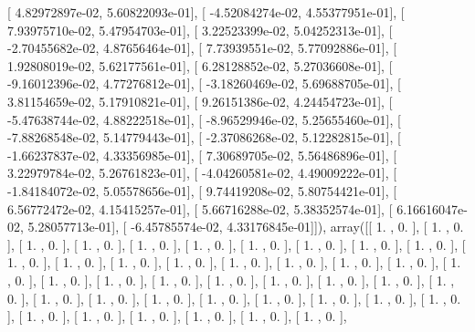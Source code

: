 \documentclass{article}
\begin{document}
       [  4.82972897e-02,   5.60822093e-01],
       [ -4.52084274e-02,   4.55377951e-01],
       [  7.93975710e-02,   5.47954703e-01],
       [  3.22523399e-02,   5.04252313e-01],
       [ -2.70455682e-02,   4.87656464e-01],
       [  7.73939551e-02,   5.77092886e-01],
       [  1.92808019e-02,   5.62177561e-01],
       [  6.28128852e-02,   5.27036608e-01],
       [ -9.16012396e-02,   4.77276812e-01],
       [ -3.18260469e-02,   5.69688705e-01],
       [  3.81154659e-02,   5.17910821e-01],
       [  9.26151386e-02,   4.24454723e-01],
       [ -5.47638744e-02,   4.88222518e-01],
       [ -8.96529946e-02,   5.25655460e-01],
       [ -7.88268548e-02,   5.14779443e-01],
       [ -2.37086268e-02,   5.12282815e-01],
       [ -1.66237837e-02,   4.33356985e-01],
       [  7.30689705e-02,   5.56486896e-01],
       [  3.22979784e-02,   5.26761823e-01],
       [ -4.04260581e-02,   4.49009222e-01],
       [ -1.84184072e-02,   5.05578656e-01],
       [  9.74419208e-02,   5.80754421e-01],
       [  6.56772472e-02,   4.15415257e-01],
       [  5.66716288e-02,   5.38352574e-01],
       [  6.16616047e-02,   5.28057713e-01],
       [ -6.45785574e-02,   4.33176845e-01]]), array([[ 1.        ,  0.        ],
       [ 1.        ,  0.        ],
       [ 1.        ,  0.        ],
       [ 1.        ,  0.        ],
       [ 1.        ,  0.        ],
       [ 1.        ,  0.        ],
       [ 1.        ,  0.        ],
       [ 1.        ,  0.        ],
       [ 1.        ,  0.        ],
       [ 1.        ,  0.        ],
       [ 1.        ,  0.        ],
       [ 1.        ,  0.        ],
       [ 1.        ,  0.        ],
       [ 1.        ,  0.        ],
       [ 1.        ,  0.        ],
       [ 1.        ,  0.        ],
       [ 1.        ,  0.        ],
       [ 1.        ,  0.        ],
       [ 1.        ,  0.        ],
       [ 1.        ,  0.        ],
       [ 1.        ,  0.        ],
       [ 1.        ,  0.        ],
       [ 1.        ,  0.        ],
       [ 1.        ,  0.        ],
       [ 1.        ,  0.        ],
       [ 1.        ,  0.        ],
       [ 1.        ,  0.        ],
       [ 1.        ,  0.        ],
       [ 1.        ,  0.        ],
       [ 1.        ,  0.        ],
       [ 1.        ,  0.        ],
       [ 1.        ,  0.        ],
       [ 1.        ,  0.        ],
       [ 1.        ,  0.        ],
       [ 1.        ,  0.        ],
       [ 1.        ,  0.        ],
       [ 1.        ,  0.        ],
       [ 1.        ,  0.        ],
       [ 1.        ,  0.        ],
       [ 1.        ,  0.        ],
       [ 1.        ,  0.        ],
\end{document}
